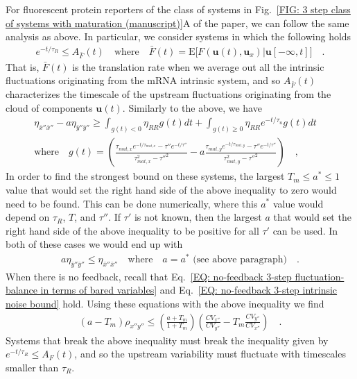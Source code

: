 \documentclass[%
 reprint,
superscriptaddress,
%
%
%
%
%
%
%
%
%
 amsmath,amssymb,
 aps,
%
%
%
%
%
%
onecolumn]{revtex4-2}
\begin{document}
For fluorescent protein reporters of the class of systems in Fig.~\ref{FIG: 3 step class of systems with maturation (manuscript)}A of the paper, we can follow the same analysis as above. In particular, 
we consider systems in which the following holds
\begin{align*}
 e^{-t/\tau_{R}} \leq A_{\bar{F}}(t) \quad \text{where} \quad \bar{F}(t) = \mathrm{E}\big[ F(\mathbf{u}(t), \mathbf{u}_{x}) | \mathbf{u}[-\infty,t] \big] \quad .
\end{align*}
That is, $\bar{F}(t)$ is the translation rate when we average out all the intrinsic fluctuations originating from the mRNA intrinsic system, and so 
$A_{\bar{F}}(t)$ characterizes the timescale of the upstream fluctuations originating from the cloud of components $\mathbf{u}(t)$. 
Similarly to the above, we have 
\begin{align*}
  \eta_{\bar{x}''\bar{x}''} - a \eta_{\bar{y}''\bar{y}''} 
  \geq \int_{g(t) < 0} \eta_{RR} g(t)  dt 
  +  \int_{g(t) \geq 0} \eta_{RR} e^{-t/\tau_{u}}g(t) dt \quad \\
  \text{where} \quad g(t) = \left( \frac{\tau_{mat,x}e^{-t/\tau_{mat,x}}-\tau''e^{-t/\tau''}}{\tau_{mat,x}^{2} - \tau''^{2}} - a \frac{\tau_{mat,y}e^{-t/\tau_{mat,y}}-\tau''e^{-t/\tau''}}{\tau_{mat,y}^{2} - \tau''^{2}}\right) \quad ,
\end{align*}
In order to find the strongest bound on these systems, the largest $T_{m} \leq a^* \leq 1$ value that would set the right hand side of the above inequality to zero would need to be found. This can be done 
numerically, where this $a^*$ value would depend on $\tau_{R}$, $T$, and $\tau''$. If $\tau'$ is not known, then the largest $a$ that would set the right hand side of the above inequality to be positive for all $\tau'$ can be used. In both of these cases we would end up with 
\begin{align*}
 a \eta_{\bar{y}''\bar{y}''} \leq \eta_{\bar{x}''\bar{x}''}  \quad \text{where} \quad a = a^{*} \text{ (see above paragraph)}\quad . 
\end{align*}
When there is no feedback, recall that Eq.~\eqref{EQ: no-feedback 3-step fluctuation-balance in terms of bared variables} and Eq.~\eqref{EQ: no-feedback 3-step intrinsic noise bound} hold. 
Using these equations with the above inequality we find 
\begin{align}
 (a - T_{m})\rho_{x''y''} \leq \left( \frac{a + T_{m}}{1+T_{m}} \right) \left( \frac{CV_{x''}}{CV_{y''}} - T_{m}\frac{CV_{y''}}{CV_{x''}}\right) \quad  .
\end{align}
Systems that break the above inequality must break the inequality given by $e^{-t/\tau_{R}} \leq A_{F}(t)$, and so the upstream variability must 
fluctuate with timescales smaller than $\tau_{R}$. 
\end{document}

